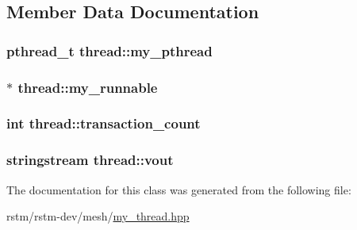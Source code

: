 \subsection{Member Data Documentation}
\hypertarget{classthread_aa59a950277a15e2662021b3fe6cd3df6}{
\subsubsection[{my\-\_\-pthread}]{\setlength{\rightskip}{0pt plus 5cm}pthread\-\_\-t thread\-::my\-\_\-pthread\hspace{0.3cm}{\ttfamily [private]}}}\label{classthread_aa59a950277a15e2662021b3fe6cd3df6}
\hypertarget{classthread_a1cfb7ceefe6a1e6ca21bab30145668a0}{
\subsubsection[{my\-\_\-runnable}]{$\ast$ thread\-::my\-\_\-runnable\hspace{0.3cm}{\ttfamily [private]}}}\label{classthread_a1cfb7ceefe6a1e6ca21bab30145668a0}
\hypertarget{classthread_a322a7b4d5150e631784b84bc200b0e11}{
\subsubsection[{transaction\-\_\-count}]{\setlength{\rightskip}{0pt plus 5cm}int thread\-::transaction\-\_\-count\hspace{0.3cm}{\ttfamily [private]}}}\label{classthread_a322a7b4d5150e631784b84bc200b0e11}
\hypertarget{classthread_a96a5f4b8956359ad5840c7178c4ca32e}{
\subsubsection[{vout}]{\setlength{\rightskip}{0pt plus 5cm}stringstream thread\-::vout}}\label{classthread_a96a5f4b8956359ad5840c7178c4ca32e}


The documentation for this class was generated from the following file\-:\begin{DoxyCompactItemize}
\item 
rstm/rstm-\/dev/mesh/\hyperlink{my__thread_8hpp}{my\-\_\-thread.\-hpp}\end{DoxyCompactItemize}
